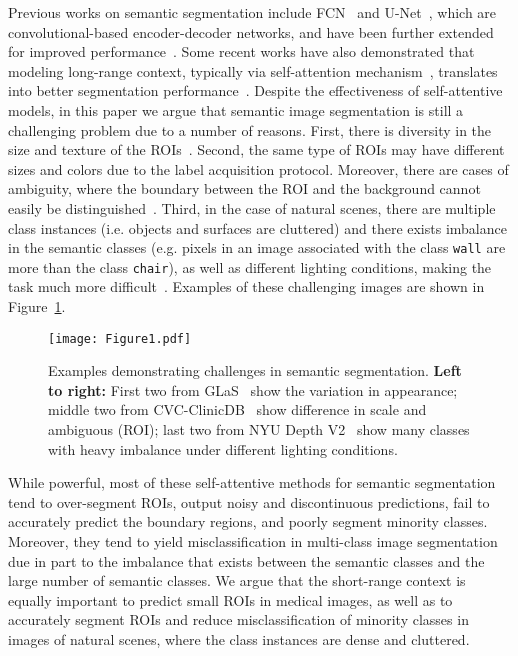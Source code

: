 \documentclass{bmvc2k}
\begin{document}
Previous works on semantic segmentation include FCN~\cite{long2015fully} and U-Net~\cite{ronneberger2015u}, which are convolutional-based encoder-decoder networks, and have been further extended for improved performance~\cite{zunair2021sharp,zhou2019unet++,xiao2018weighted,jha2019resunet++,fang2019selective}. Some recent works have also demonstrated that modeling long-range context, typically via self-attention mechanism~\cite{vaswani2017attention}, translates into better segmentation performance~\cite{oktay2018attention,wang2020axial,valanarasu2021medical,xu2021levit}. Despite the effectiveness of self-attentive models, in this paper we argue that semantic image segmentation is still a challenging problem due to a number of reasons. First, there is diversity in the size and texture of the ROIs~\cite{sirinukunwattana2017gland}. Second, the same type of ROIs may have different sizes and colors due to the label acquisition protocol. Moreover, there are cases of ambiguity, where the boundary between the ROI and the background cannot easily be distinguished~\cite{jha2020kvasir,bernal2015wm}. Third, in the case of natural scenes, there are multiple class instances (i.e. objects and surfaces are cluttered) and there exists imbalance in the semantic classes (e.g. pixels in an image associated with the class \texttt{wall} are more than the class \texttt{chair}), as well as different lighting conditions, making the task much more difficult~\cite{lai2011large}. Examples of these challenging images are shown in Figure~\ref{Fig:hard_images}.

\begin{figure}[!htb]
\centering
\texttt{[image: Figure1.pdf]}
\caption{Examples demonstrating challenges in semantic segmentation. \textbf{Left to right:} First two from GLaS~\cite{sirinukunwattana2017gland} show the variation in appearance; middle two from CVC-ClinicDB~\cite{bernal2015wm} show difference in scale and ambiguous (ROI); last two from NYU Depth V2~\cite{Silberman:ECCV12} show many classes with heavy imbalance under different lighting conditions.}
\label{Fig:hard_images}
\end{figure}

While powerful, most of these self-attentive methods for semantic segmentation tend to over-segment ROIs, output noisy and discontinuous predictions, fail to accurately predict the boundary regions, and poorly segment minority classes. Moreover, they tend to yield misclassification in multi-class image segmentation due in part to the imbalance that exists between the semantic classes and the large number of semantic classes. We argue that the short-range context is equally important to predict small ROIs in medical images, as well as to accurately segment ROIs and reduce misclassification of minority classes in images of natural scenes, where the class instances are dense and cluttered.
\end{document}
